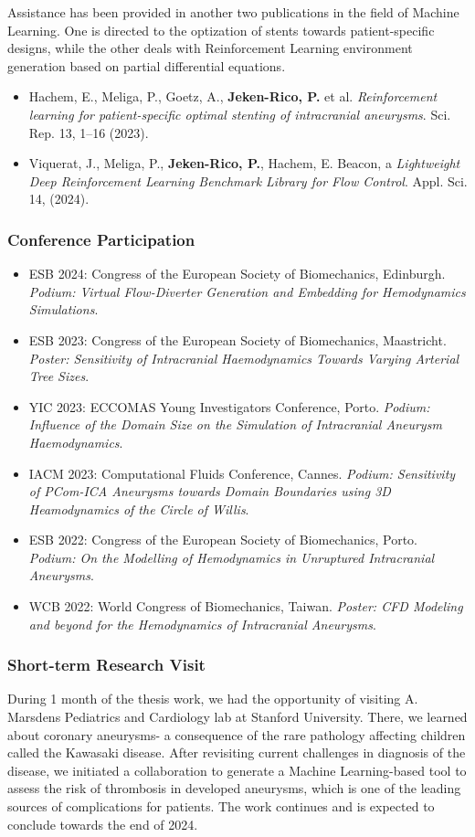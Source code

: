 Assistance has been provided in another two publications in the field of Machine Learning. One is directed to the optization of stents towards patient-specific designs, while the other deals with Reinforcement Learning environment generation based on partial differential equations.
\begin{itemize}
	\item Hachem, E., Meliga, P., Goetz, A., \textbf{Jeken-Rico, P.} et al. \textit{Reinforcement learning for patient-specific optimal stenting of intracranial aneurysms}. Sci. Rep. 13, 1–16 (2023).
	\item Viquerat, J., Meliga, P., \textbf{Jeken-Rico, P.}, Hachem, E. Beacon, a \textit{Lightweight Deep Reinforcement Learning Benchmark Library for Flow Control}. Appl. Sci. 14, (2024).
\end{itemize}


\subsubsection*{Conference Participation}
\begin{itemize}
	\item ESB 2024: Congress of the European Society of Biomechanics, Edinburgh. \textit{Podium: Virtual Flow-Diverter Generation and Embedding for Hemodynamics Simulations}.
	\item ESB 2023: Congress of the European Society of Biomechanics, Maastricht. \textit{Poster: Sensitivity of Intracranial Haemodynamics Towards Varying Arterial Tree Sizes}.
	\item YIC 2023: ECCOMAS Young Investigators Conference, Porto. \textit{Podium: Influence of the Domain Size on the Simulation of Intracranial Aneurysm
	Haemodynamics}.
	\item IACM 2023: Computational Fluids Conference, Cannes. \textit{Podium: Sensitivity of PCom-ICA Aneurysms towards Domain Boundaries using 3D
	Heamodynamics of the Circle of Willis}.
	\item ESB 2022: Congress of the European Society of Biomechanics, Porto. \textit{Podium: On the Modelling of Hemodynamics in Unruptured Intracranial Aneurysms}.
	\item WCB 2022: World Congress of Biomechanics, Taiwan. \textit{Poster: CFD Modeling and beyond for the Hemodynamics of Intracranial Aneurysms}.
\end{itemize}

\subsubsection*{Short-term Research Visit}
During 1 month of the thesis work, we had the opportunity of visiting A. Marsdens Pediatrics and Cardiology lab at Stanford University. There, we learned about coronary aneurysms- a consequence of the rare pathology affecting children called the Kawasaki disease. After revisiting current challenges in diagnosis of the disease, we initiated a collaboration to generate a Machine Learning-based tool to assess the risk of thrombosis in developed aneurysms, which is one of the leading sources of complications for patients. The work continues and is expected to conclude towards the end of 2024.

\newpage

\renewcommand{\bibname}{References}
{\footnotesize
	}